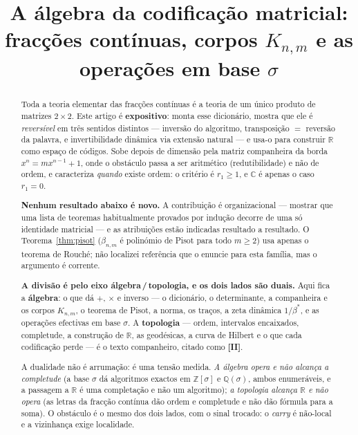 \documentclass[11pt,a4paper]{article}
\title{A álgebra da codificação matricial:\\ fracções contínuas, corpos $K_{n,m}$ e as operações em base $\sigma$}
\author{}
\date{}
\theoremstyle{plain}
\theoremstyle{definition}
\theoremstyle{remark}
\newcommand{\R}{\mathbb{R}}
\newcommand{\C}{\mathbb{C}}
\newcommand{\Q}{\mathbb{Q}}
\newcommand{\Z}{\mathbb{Z}}
\begin{document}
\maketitle

\begin{abstract}
\noindent
Toda a teoria elementar das fracções contínuas é a teoria de um único produto de matrizes
$2\times2$. Este artigo é \textbf{expositivo}: monta esse dicionário, mostra que ele é
\emph{reversível} em três sentidos distintos --- inversão do algoritmo, transposição $=$ reversão da
palavra, e invertibilidade dinâmica via extensão natural --- e usa-o para construir $\R$ como espaço
de códigos. Sobe depois de dimensão pela matriz companheira da borda $x^n = mx^{n-1}+1$, onde o
obstáculo passa a ser aritmético (redutibilidade) e não de ordem, e caracteriza \emph{quando} existe
ordem: o critério é $r_1\geq1$, e $\C$ é apenas o caso $r_1=0$.

\medskip
\noindent\textbf{Nenhum resultado abaixo é novo.} A contribuição é organizacional --- mostrar que
uma lista de teoremas habitualmente provados por indução decorre de uma só identidade matricial ---
e as atribuições estão indicadas resultado a resultado. O Teorema~\ref{thm:pisot} ($\beta_{n,m}$ é
polinómio de Pisot para todo $m\geq2$) usa apenas o teorema de Rouché; não localizei referência que
o enuncie para esta família, mas o argumento é corrente.

\medskip
\noindent \textbf{A divisão é pelo eixo álgebra\,/\,topologia, e os dois lados são duais.} Aqui fica
a \textbf{álgebra}: o que dá $+$, $\times$ e inverso --- o dicionário, o determinante, a companheira
e os corpos $K_{n,m}$, o teorema de Pisot, a norma, os traços, a zeta dinâmica $1/\beta^*$, e as
operações efectivas em base $\sigma$. A \textbf{topologia} --- ordem, intervalos encaixados,
completude, a construção de $\R$, as geodésicas, a curva de Hilbert e o que cada codificação perde
--- é o texto companheiro, citado como \textbf{[II]}.

A dualidade não é arrumação: é uma tensão medida. \emph{A álgebra opera e não alcança a completude}
(a base $\sigma$ dá algoritmos exactos em $\Z[\sigma]$ e $\Q(\sigma)$, ambos enumeráveis, e a
passagem a $\R$ é uma completação e não um algoritmo); \emph{a topologia alcança $\R$ e não opera}
(as letras da fracção contínua dão ordem e completude e não dão fórmula para a soma). O obstáculo é
o mesmo dos dois lados, com o sinal trocado: o \emph{carry} é não-local e a vizinhança exige
localidade.
\end{abstract}
\end{document}
